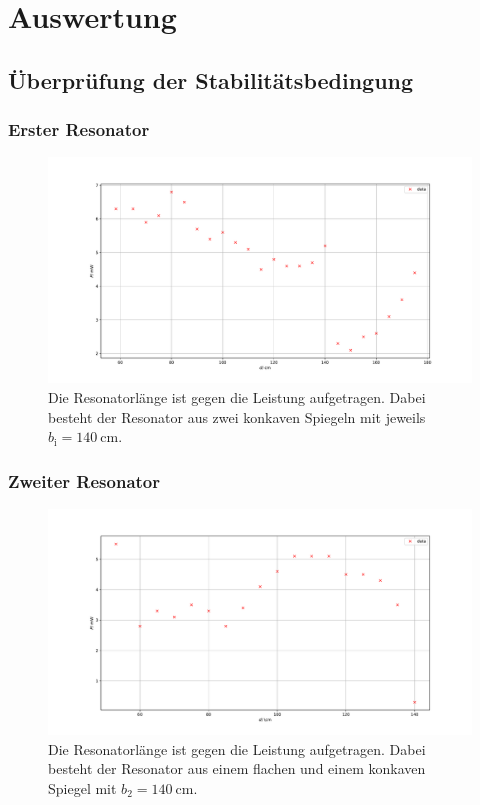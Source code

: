 \section{Auswertung}
\label{sec:Auswertung}

\subsection{Überprüfung der Stabilitätsbedingung}

\subsubsection{Erster Resonator}


\begin{figure}
    \centering
    \includegraphics[width=15cm]{plots/stability140.pdf}
    \caption{Die Resonatorlänge ist gegen die Leistung aufgetragen. Dabei besteht der Resonator aus zwei konkaven Spiegeln mit jeweils $b_\text{i} = \SI{140}{\centi\meter}$.}
    \label{fig:stability140}
\end{figure}   

\subsubsection{Zweiter Resonator}



\begin{figure}
    \centering
    \includegraphics[width=15cm]{plots/stability_flat.pdf}
    \caption{Die Resonatorlänge ist gegen die Leistung aufgetragen. Dabei besteht der Resonator aus einem flachen und einem konkaven Spiegel mit $b_2 = \SI{140}{\centi\meter}$.}
    \label{fig:stability_flat}
\end{figure} 


